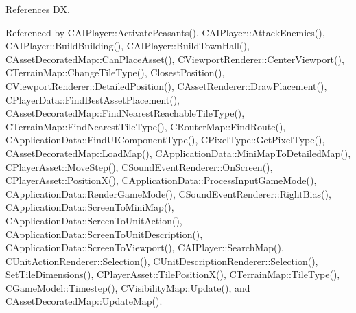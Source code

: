 References DX.



Referenced by C\+A\+I\+Player\+::\+Activate\+Peasants(), C\+A\+I\+Player\+::\+Attack\+Enemies(), C\+A\+I\+Player\+::\+Build\+Building(), C\+A\+I\+Player\+::\+Build\+Town\+Hall(), C\+Asset\+Decorated\+Map\+::\+Can\+Place\+Asset(), C\+Viewport\+Renderer\+::\+Center\+Viewport(), C\+Terrain\+Map\+::\+Change\+Tile\+Type(), Closest\+Position(), C\+Viewport\+Renderer\+::\+Detailed\+Position(), C\+Asset\+Renderer\+::\+Draw\+Placement(), C\+Player\+Data\+::\+Find\+Best\+Asset\+Placement(), C\+Asset\+Decorated\+Map\+::\+Find\+Nearest\+Reachable\+Tile\+Type(), C\+Terrain\+Map\+::\+Find\+Nearest\+Tile\+Type(), C\+Router\+Map\+::\+Find\+Route(), C\+Application\+Data\+::\+Find\+U\+I\+Component\+Type(), C\+Pixel\+Type\+::\+Get\+Pixel\+Type(), C\+Asset\+Decorated\+Map\+::\+Load\+Map(), C\+Application\+Data\+::\+Mini\+Map\+To\+Detailed\+Map(), C\+Player\+Asset\+::\+Move\+Step(), C\+Sound\+Event\+Renderer\+::\+On\+Screen(), C\+Player\+Asset\+::\+Position\+X(), C\+Application\+Data\+::\+Process\+Input\+Game\+Mode(), C\+Application\+Data\+::\+Render\+Game\+Mode(), C\+Sound\+Event\+Renderer\+::\+Right\+Bias(), C\+Application\+Data\+::\+Screen\+To\+Mini\+Map(), C\+Application\+Data\+::\+Screen\+To\+Unit\+Action(), C\+Application\+Data\+::\+Screen\+To\+Unit\+Description(), C\+Application\+Data\+::\+Screen\+To\+Viewport(), C\+A\+I\+Player\+::\+Search\+Map(), C\+Unit\+Action\+Renderer\+::\+Selection(), C\+Unit\+Description\+Renderer\+::\+Selection(), Set\+Tile\+Dimensions(), C\+Player\+Asset\+::\+Tile\+Position\+X(), C\+Terrain\+Map\+::\+Tile\+Type(), C\+Game\+Model\+::\+Timestep(), C\+Visibility\+Map\+::\+Update(), and C\+Asset\+Decorated\+Map\+::\+Update\+Map().


